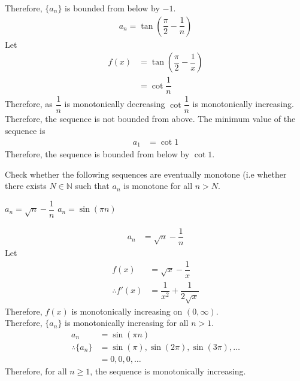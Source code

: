 \documentclass[fleqn, a4paper, 12pt, oneside]{amsart}
\theoremstyle{definition}
\theoremstyle{theorem}
\begin{document}
\begin{solution}
\begin{tasks}
			Therefore, $\{a_n\}$ is bounded from below by $-1$.
		\task
			\begin{align*}
				a_n = \tan \left( \dfrac{\pi}{2} - \dfrac{1}{n} \right)
			\end{align*}
			Let
			\begin{align*}
				f(x) &= \tan \left( \dfrac{\pi}{2} - \dfrac{1}{x} \right)\\
				&= \cot \dfrac{1}{n}
			\end{align*}
			Therefore, as $\dfrac{1}{n}$ is monotonically decreasing $\cot \dfrac{1}{n}$ is monotonically increasing.\\
			Therefore, the sequence is not bounded from above.
			The minimum value of the sequence is
			\begin{align*}
				a_1 &= \cot 1
			\end{align*}
			Therefore, the sequence is bounded from below by $\cot 1$.
	\end{tasks}
\end{solution}

\begin{question}
	Check whether the following sequences are eventually monotone (i.e whether there exists $N \in \mathbb{N}$ such that $a_n$ is monotone for all $n > N$.
	\begin{tasks}
		\task $a_n = \sqrt{n} - \dfrac{1}{n}$
		\task $a_n = \sin (\pi n)$
	\end{tasks}
\end{question}

\begin{solution}
	\begin{tasks}
		\task
			\begin{align*}
				a_n &= \sqrt{n} - \dfrac{1}{n}
			\end{align*}
			Let
			\begin{align*}
				f(x) &= \sqrt{x} - \dfrac{1}{x}\\
				\therefore f'(x) &= \dfrac{1}{x^2} + \dfrac{1}{2 \sqrt{x}}
			\end{align*}
			Therefore, $f(x)$ is monotonically increasing on $(0,\infty)$.\\
			Therefore, $\{a_n\}$ is monotonically increasing for all $n > 1$.
		\task
			\begin{align*}
				a_n &= \sin (\pi n)\\
				\therefore \{a_n\} &= \sin (\pi), \sin (2 \pi), \sin (3 \pi), \dots\\
				&= 0, 0, 0, \dots
			\end{align*}
			Therefore, for all $n \ge 1$, the sequence is monotonically increasing.
	\end{tasks}
\end{solution}
\end{document}
